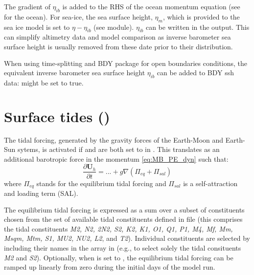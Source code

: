 \documentclass[../main/NEMO_manual]{subfiles}
\begin{document}
The gradient of $\eta_{ib}$ is added to the RHS of the ocean momentum equation (see  for the ocean).
For sea-ice, the sea surface height, $\eta_m$, which is provided to the sea ice model is set to $\eta - \eta_{ib}$
(see  module).
$\eta_{ib}$ can be written in the output.
This can simplify altimetry data and model comparison as
inverse barometer sea surface height is usually removed from these date prior to their distribution.

When using time-splitting and BDY package for open boundaries conditions,
the equivalent inverse barometer sea surface height $\eta_{ib}$ can be added to BDY ssh data:
  might be set to true.

\section[Surface tides (\textit{sbctide.F90})]{Surface tides (\protect{})}
\label{sec:SBC_tide}

\begin{listing}
  \caption{}
  \label{lst:nam_tide}
\end{listing}

The tidal forcing, generated by the gravity forces of the Earth-Moon and Earth-Sun sytems,
is activated if  and  are both set to  in .
This translates as an additional barotropic force in the momentum \autoref{eq:MB_PE_dyn} such that:
\[
  \frac{\partial {\mathrm {\mathbf U}}_h }{\partial t}= ...
  +g\nabla (\Pi_{eq} + \Pi_{sal})
\]
where $\Pi_{eq}$ stands for the equilibrium tidal forcing and
$\Pi_{sal}$ is a self-attraction and loading term (SAL).

The equilibrium tidal forcing is expressed as a sum over a subset of
constituents chosen from the set of available tidal constituents
defined in file  (this comprises the tidal
constituents \textit{M2, N2, 2N2, S2, K2, K1, O1, Q1, P1, M4, Mf, Mm,
  Msqm, Mtm, S1, MU2, NU2, L2}, and \textit{T2}). Individual
constituents are selected by including their names in the array
 in  (e.g., 
 to select solely the tidal consituents \textit{M2}
and \textit{S2}). Optionally, when  is set to
, the equilibrium tidal forcing can be ramped up
linearly from zero during the initial  days of the
model run.
\end{document}
